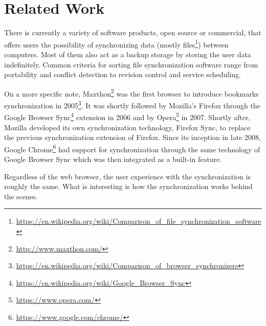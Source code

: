\section{Related Work}
\label{sec:related-work}

There is currently a variety of software products, open source or commercial, that offers users the possibility of synchronizing data (mostly files\footnote{\url{https://en.wikipedia.org/wiki/Comparison_of_file_synchronization_software}}) between computers. Most of them also act as a backup storage by storing the user data indefinitely. Common criteria for sorting file synchronization software range from portability and conflict detection to revision control and service scheduling.

On a more specific note, Maxthon\footnote{\url{http://www.maxthon.com/}} was the first browser to introduce bookmarks synchronization in 2005\footnote{\url{https://en.wikipedia.org/wiki/Comparison_of_browser_synchronizers}}. It was shortly followed by Mozilla's Firefox through the Google Browser Sync\footnote{\url{https://en.wikipedia.org/wiki/Google_Browser_Sync}} extension in 2006 and by Opera\footnote{\url{https://www.opera.com/}} in 2007. Shortly after, Mozilla developed its own synchronization technology, Firefox Sync, to replace the previous synchronization extension of Firefox. Since its inception in late 2008, Google Chrome\footnote{\url{https://www.google.com/chrome/}} had support for synchronization through the same technology of Google Browser Sync which was then integrated as a built-in feature.

Regardless of the web browser, the user experience with the synchronization is roughly the same. What is interesting is how the synchronization works behind the scenes.
